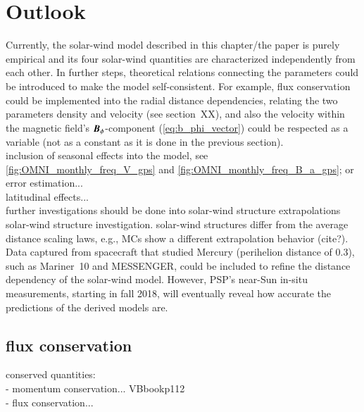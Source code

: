 \section{Outlook}
Currently, the solar-wind model described in this chapter/the paper is purely empirical and its four solar-wind quantities are characterized independently from each other. In further steps, theoretical relations connecting the parameters could be introduced to make the model self-consistent. For example, flux conservation could be implemented into the radial distance dependencies, relating the two parameters density and velocity (see section~XX), and also the velocity within the magnetic field's $\boldsymbol{B}_\phi$-component (\autoref{eq:b_phi_vector}) could be respected as a variable (not as a constant as it is done in the previous section).\\

inclusion of seasonal effects into the model, see \autoref{fig:OMNI_monthly_freq_V_gps} and \autoref{fig:OMNI_monthly_freq_B_a_gps}; or error estimation...\\

latitudinal effects...\\

further investigations should be done into solar-wind structure extrapolations\\
solar-wind structure investigation. solar-wind structures differ from the average distance scaling laws, e.g., MCs show a different extrapolation behavior (cite?).\\

Data captured from spacecraft that studied Mercury (perihelion distance of \SI{0.3}{\au}), such as Mariner~10 and MESSENGER, could be included to refine the distance dependency of the solar-wind model.
However, PSP's near-Sun in-situ measurements, starting in fall 2018, will eventually reveal how accurate the predictions of the derived models are.\\


\subsection{flux conservation}
conserved quantities:\\
- momentum conservation... VBbookp112\\
- flux conservation...\\


